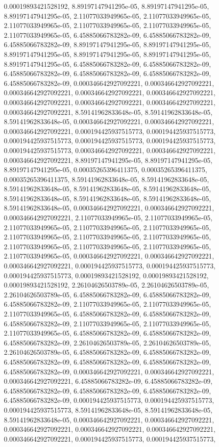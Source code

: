 \documentclass[
  ,man]{apa6}
\begin{document}
0.00019893421528192, 8.89197147941295e-05, 8.89197147941295e-05, 8.89197147941295e-05, 2.11077033949965e-05, 2.11077033949965e-05, 2.11077033949965e-05, 2.11077033949965e-05, 2.11077033949965e-05, 2.11077033949965e-05, 6.45885066783282e-09, 6.45885066783282e-09, 6.45885066783282e-09, 8.89197147941295e-05, 8.89197147941295e-05, 8.89197147941295e-05, 8.89197147941295e-05, 8.89197147941295e-05, 8.89197147941295e-05, 6.45885066783282e-09, 6.45885066783282e-09, 6.45885066783282e-09, 6.45885066783282e-09,
6.45885066783282e-09, 6.45885066783282e-09, 0.000346642927092221, 0.000346642927092221, 0.000346642927092221, 0.000346642927092221, 0.000346642927092221, 0.000346642927092221, 0.000346642927092221, 0.000346642927092221, 0.000346642927092221, 8.59141962833648e-05, 8.59141962833648e-05, 8.59141962833648e-05, 0.000346642927092221, 0.000346642927092221, 0.000346642927092221, 0.000194425937515773, 0.000194425937515773, 0.000194425937515773, 0.000194425937515773, 0.000194425937515773, 0.000194425937515773,
0.000346642927092221, 0.000346642927092221, 0.000346642927092221, 8.89197147941295e-05, 8.89197147941295e-05, 8.89197147941295e-05, 0.00035265396411375, 0.00035265396411375, 0.00035265396411375, 8.59141962833648e-05, 8.59141962833648e-05, 8.59141962833648e-05, 8.59141962833648e-05, 8.59141962833648e-05, 8.59141962833648e-05, 8.59141962833648e-05, 8.59141962833648e-05, 8.59141962833648e-05, 0.000346642927092221, 0.000346642927092221, 0.000346642927092221, 2.11077033949965e-05, 2.11077033949965e-05,
2.11077033949965e-05, 2.11077033949965e-05, 2.11077033949965e-05, 2.11077033949965e-05, 2.11077033949965e-05, 2.11077033949965e-05, 2.11077033949965e-05, 2.11077033949965e-05, 2.11077033949965e-05, 2.11077033949965e-05, 0.000346642927092221, 0.000346642927092221, 0.000346642927092221, 0.000194425937515773, 0.000194425937515773, 0.000194425937515773, 0.00019893421528192, 0.00019893421528192, 0.00019893421528192, 2.26104626503789e-05, 2.26104626503789e-05, 2.26104626503789e-05, 6.45885066783282e-09,
6.45885066783282e-09, 6.45885066783282e-09, 2.11077033949965e-05, 2.11077033949965e-05, 2.11077033949965e-05, 6.45885066783282e-09, 6.45885066783282e-09, 6.45885066783282e-09, 2.11077033949965e-05, 2.11077033949965e-05, 2.11077033949965e-05, 6.45885066783282e-09, 6.45885066783282e-09, 6.45885066783282e-09, 2.26104626503789e-05, 2.26104626503789e-05, 2.26104626503789e-05, 6.45885066783282e-09, 6.45885066783282e-09, 6.45885066783282e-09, 6.45885066783282e-09, 6.45885066783282e-09, 6.45885066783282e-09,
0.000346642927092221, 0.000346642927092221, 0.000346642927092221, 6.45885066783282e-09, 6.45885066783282e-09, 6.45885066783282e-09, 6.45885066783282e-09, 6.45885066783282e-09, 6.45885066783282e-09, 0.000194425937515773, 0.000194425937515773, 0.000194425937515773, 8.59141962833648e-05, 8.59141962833648e-05, 8.59141962833648e-05, 0.000346642927092221, 0.000346642927092221, 0.000346642927092221, 0.000346642927092221, 0.000346642927092221, 0.000346642927092221, 0.000194425937515773, 0.000194425937515773,
\end{document}
